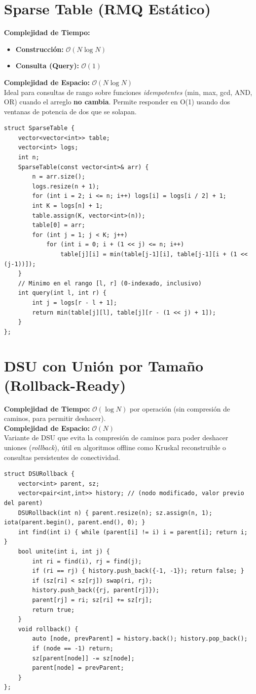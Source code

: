 \documentclass[10pt,twocolumn,letterpaper]{report}
\begin{document}
\section{Sparse Table (RMQ Estático)}
\textbf{Complejidad de Tiempo:}
\begin{itemize}
    \item \textbf{Construcción:} $\mathcal{O}(N \log N)$
    \item \textbf{Consulta (Query):} $\mathcal{O}(1)$
\end{itemize}
\textbf{Complejidad de Espacio:} $\mathcal{O}(N \log N)$ \\
Ideal para consultas de rango sobre funciones \textit{idempotentes} (min, max, gcd, AND, OR) cuando el arreglo \textbf{no cambia}. Permite responder en O(1) usando dos ventanas de potencia de dos que se solapan.
\begin{lstlisting}
struct SparseTable {
    vector<vector<int>> table;
    vector<int> logs;
    int n;
    SparseTable(const vector<int>& arr) {
        n = arr.size();
        logs.resize(n + 1);
        for (int i = 2; i <= n; i++) logs[i] = logs[i / 2] + 1;
        int K = logs[n] + 1;
        table.assign(K, vector<int>(n));
        table[0] = arr;
        for (int j = 1; j < K; j++)
            for (int i = 0; i + (1 << j) <= n; i++)
                table[j][i] = min(table[j-1][i], table[j-1][i + (1 << (j-1))]);
    }
    // Minimo en el rango [l, r] (0-indexado, inclusivo)
    int query(int l, int r) {
        int j = logs[r - l + 1];
        return min(table[j][l], table[j][r - (1 << j) + 1]);
    }
};
\end{lstlisting}
\section{DSU con Unión por Tamaño (Rollback-Ready)}
\textbf{Complejidad de Tiempo:} $\mathcal{O}(\log N)$ por operación (sin compresión de caminos, para permitir deshacer). \\
\textbf{Complejidad de Espacio:} $\mathcal{O}(N)$ \\
Variante de DSU que evita la compresión de caminos para poder deshacer uniones (\textit{rollback}), útil en algoritmos offline como Kruskal reconstruible o consultas persistentes de conectividad.
\begin{lstlisting}
struct DSURollback {
    vector<int> parent, sz;
    vector<pair<int,int>> history; // (nodo modificado, valor previo del parent)
    DSURollback(int n) { parent.resize(n); sz.assign(n, 1); iota(parent.begin(), parent.end(), 0); }
    int find(int i) { while (parent[i] != i) i = parent[i]; return i; }
    bool unite(int i, int j) {
        int ri = find(i), rj = find(j);
        if (ri == rj) { history.push_back({-1, -1}); return false; }
        if (sz[ri] < sz[rj]) swap(ri, rj);
        history.push_back({rj, parent[rj]});
        parent[rj] = ri; sz[ri] += sz[rj];
        return true;
    }
    void rollback() {
        auto [node, prevParent] = history.back(); history.pop_back();
        if (node == -1) return;
        sz[parent[node]] -= sz[node];
        parent[node] = prevParent;
    }
};
\end{lstlisting}
\end{document}
